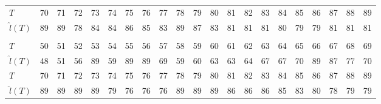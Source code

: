 \documentclass[12pt,a4paper]{article}
\begin{document}
\begin{table}
\begin{tabular*}{\textheight}{@{\extracolsep{\fill}}lrrrrrrrrrrrrrrrrrrrr}
			$T$ & 70 & 71 & 72 & 73 & 74 & 75 & 76 & 77 & 78 & 79 & 80 & 81 & 82 & 83 & 84 & 85 & 86 & 87 & 88 & 89 \\
			$\hat{l}(T)$ & 89 & 89 & 78 & 84 & 84 & 86 & 85 & 83 & 89 & 87 & 83 & 81 & 81 & 81 & 80 & 79 & 79 & 81 & 81 & 81 \\
			\midrule\addlinespace[2.5pt]
			\multicolumn{21}{c}{\textbf{$\tau=0.95,\ T_{\mathrm{entry}}(5)=85$}} \\
			\addlinespace[2.5pt]
			\midrule
			$T$ & 50 & 51 & 52 & 53 & 54 & 55 & 56 & 57 & 58 & 59 & 60 & 61 & 62 & 63 & 64 & 65 & 66 & 67 & 68 & 69 \\
			$\hat{l}(T)$ & 48 & 51 & 56 & 89 & 59 & 89 & 89 & 69 & 59 & 60 & 63 & 63 & 64 & 67 & 67 & 70 & 89 & 87 & 77 & 70 \\
			$T$ & 70 & 71 & 72 & 73 & 74 & 75 & 76 & 77 & 78 & 79 & 80 & 81 & 82 & 83 & 84 & 85 & 86 & 87 & 88 & 89 \\
			$\hat{l}(T)$ & 89 & 89 & 89 & 89 & 79 & 76 & 76 & 76 & 89 & 89 & 89 & 86 & 86 & 86 & 85 & 83 & 80 & 78 & 79 & 79 \\
			\bottomrule
		\end{tabular*}
	\end{table}
	
\end{document}
